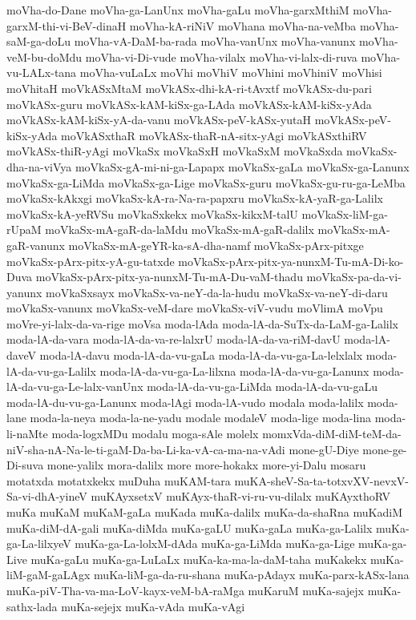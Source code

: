 {moVha-do-Dane
moVha-ga-LanUnx
moVha-gaLu
moVha-garxMthiM
moVha-garxM-thi-vi-BeV-dinaH
moVha-kA-riNiV
moVhana
moVha-na-veMba
moVha-saM-ga-doLu
moVha-vA-DaM-ba-rada
moVha-vanUnx
moVha-vanunx
moVha-veM-bu-doMdu
moVha-vi-Di-vude
moVha-vilalx
moVha-vi-lalx-di-ruva
moVha-vu-LALx-tana
moVha-vuLaLx
moVhi
moVhiV
moVhini
moVhiniV
moVhisi
moVhitaH
moVkASxMtaM
moVkASx-dhi-kA-ri-tAvxtf
moVkASx-du-pari
moVkASx-guru
moVkASx-kAM-kiSx-ga-LAda
moVkASx-kAM-kiSx-yAda
moVkASx-kAM-kiSx-yA-da-vanu
moVkASx-peV-kASx-yutaH
moVkASx-peV-kiSx-yAda
moVkASxthaR
moVkASx-thaR-nA-sitx-yAgi
moVkASxthiRV
moVkASx-thiR-yAgi
moVkaSx
moVkaSxH
moVkaSxM
moVkaSxda
moVkaSx-dha-na-viVya
moVkaSx-gA-mi-ni-ga-Lapapx
moVkaSx-gaLa
moVkaSx-ga-Lanunx
moVkaSx-ga-LiMda
moVkaSx-ga-Lige
moVkaSx-guru
moVkaSx-gu-ru-ga-LeMba
moVkaSx-kAkxgi
moVkaSx-kA-ra-Na-ra-papxru
moVkaSx-kA-yaR-ga-Lalilx
moVkaSx-kA-yeRVSu
moVkaSxkekx
moVkaSx-kikxM-talU
moVkaSx-liM-ga-rUpaM
moVkaSx-mA-gaR-da-laMdu
moVkaSx-mA-gaR-dalilx
moVkaSx-mA-gaR-vanunx
moVkaSx-mA-geYR-ka-sA-dha-namf
moVkaSx-pArx-pitxge
moVkaSx-pArx-pitx-yA-gu-tatxde
moVkaSx-pArx-pitx-ya-nunxM-Tu-mA-Di-ko-Duva
moVkaSx-pArx-pitx-ya-nunxM-Tu-mA-Du-vaM-thadu
moVkaSx-pa-da-vi-yanunx
moVkaSxsayx
moVkaSx-va-neY-da-la-hudu
moVkaSx-va-neY-di-daru
moVkaSx-vanunx
moVkaSx-veM-dare
moVkaSx-viV-vudu
moVlimA
moVpu
moVre-yi-lalx-da-va-rige
moVsa
moda-lAda
moda-lA-da-SuTx-da-LaM-ga-Lalilx
moda-lA-da-vara
moda-lA-da-va-re-lalxrU
moda-lA-da-va-riM-davU
moda-lA-daveV
moda-lA-davu
moda-lA-da-vu-gaLa
moda-lA-da-vu-ga-La-lelxlalx
moda-lA-da-vu-ga-Lalilx
moda-lA-da-vu-ga-La-lilxna
moda-lA-da-vu-ga-Lanunx
moda-lA-da-vu-ga-Le-lalx-vanUnx
moda-lA-da-vu-ga-LiMda
moda-lA-da-vu-gaLu
moda-lA-du-vu-ga-Lanunx
moda-lAgi
moda-lA-vudo
modala
moda-lalilx
moda-lane
moda-la-neya
moda-la-ne-yadu
modale
modaleV
moda-lige
moda-lina
moda-li-naMte
moda-logxMDu
modalu
moga-sAle
molelx
momxVda-diM-diM-teM-da-niV-sha-nA-Na-le-ti-gaM-Da-ba-Li-ka-vA-ca-ma-na-vAdi
mone-gU-Diye
mone-ge-Di-suva
mone-yalilx
mora-dalilx
more
more-hokakx
more-yi-Dalu
mosaru
motatxda
motatxkekx
muDuha
muKAM-tara
muKA-sheV-Sa-ta-totxvXV-nevxV-Sa-vi-dhA-yineV
muKAyxsetxV
muKAyx-thaR-vi-ru-vu-dilalx
muKAyxthoRV
muKa
muKaM
muKaM-gaLa
muKada
muKa-dalilx
muKa-da-shaRna
muKadiM
muKa-diM-dA-gali
muKa-diMda
muKa-gaLU
muKa-gaLa
muKa-ga-Lalilx
muKa-ga-La-lilxyeV
muKa-ga-La-lolxM-dAda
muKa-ga-LiMda
muKa-ga-Lige
muKa-ga-Live
muKa-gaLu
muKa-ga-LuLaLx
muKa-ka-ma-la-daM-taha
muKakekx
muKa-liM-gaM-gaLAgx
muKa-liM-ga-da-ru-shana
muKa-pAdayx
muKa-parx-kASx-lana
muKa-piV-Tha-va-ma-LoV-kayx-veM-bA-raMga
muKaruM
muKa-sajejx
muKa-sathx-lada
muKa-sejejx
muKa-vAda
muKa-vAgi
}
